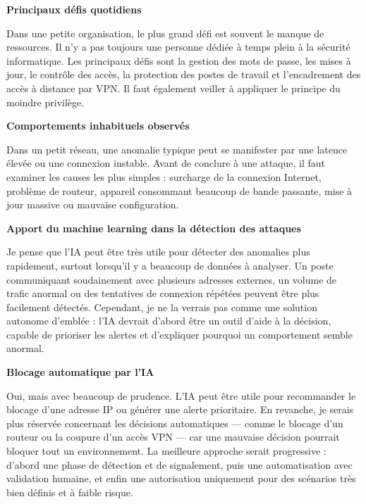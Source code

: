 \documentclass[12pt,a4paper]{report}
\begin{document}
\bigskip
\textbf{Principaux défis quotidiens}

Dans une petite organisation, le plus grand d\'{e}fi est souvent le manque de ressources. Il n'y a pas toujours une personne d\'{e}di\'{e}e \`{a} temps plein \`{a} la s\'{e}curit\'{e} informatique. Les principaux d\'{e}fis sont la gestion des mots de passe, les mises \`{a} jour, le contr\^{o}le des acc\`{e}s, la protection des postes de travail et l'encadrement des acc\`{e}s \`{a} distance par VPN. Il faut \'{e}galement veiller \`{a} appliquer le principe du moindre privil\`{e}ge.

\bigskip
\textbf{Comportements inhabituels observés}

Dans un petit r\'{e}seau, une anomalie typique peut se manifester par une latence \'{e}lev\'{e}e ou une connexion instable. Avant de conclure \`{a} une attaque, il faut examiner les causes les plus simples : surcharge de la connexion Internet, probl\`{e}me de routeur, appareil consommant beaucoup de bande passante, mise \`{a} jour massive ou mauvaise configuration.

\bigskip
\textbf{Apport du machine learning dans la détection des attaques}

Je pense que l'IA peut \^{e}tre tr\`{e}s utile pour d\'{e}tecter des anomalies plus rapidement, surtout lorsqu'il y a beaucoup de donn\'{e}es \`{a} analyser. Un poste communiquant soudainement avec plusieurs adresses externes, un volume de trafic anormal ou des tentatives de connexion r\'{e}p\'{e}t\'{e}es peuvent \^{e}tre plus facilement d\'{e}tect\'{e}s. Cependant, je ne la verrais pas comme une solution autonome d'embl\'{e}e : l'IA devrait d'abord \^{e}tre un outil d'aide \`{a} la d\'{e}cision, capable de prioriser les alertes et d'expliquer pourquoi un comportement semble anormal.

\bigskip
\textbf{Blocage automatique par l'IA}

Oui, mais avec beaucoup de prudence. L'IA peut \^{e}tre utile pour recommander le blocage d'une adresse IP ou g\'{e}n\'{e}rer une alerte prioritaire. En revanche, je serais plus r\'{e}serv\'{e}e concernant les d\'{e}cisions automatiques --- comme le blocage d'un routeur ou la coupure d'un acc\`{e}s VPN --- car une mauvaise d\'{e}cision pourrait bloquer tout un environnement. La meilleure approche serait progressive : d'abord une phase de d\'{e}tection et de signalement, puis une automatisation avec validation humaine, et enfin une autorisation uniquement pour des sc\'{e}narios tr\`{e}s bien d\'{e}finis et \`{a} faible risque.
\end{document}
